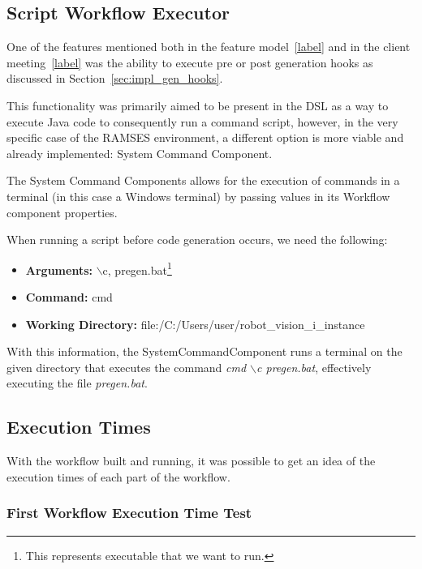 \subsection{Script Workflow Executor}
\label{sec:workflows_script_executor}

One of the features mentioned both in the feature model~\ref{label} and in the client meeting~\ref{label} was the ability to execute pre or post generation hooks as discussed in Section~\ref{sec:impl_gen_hooks}. 

This functionality was primarily aimed to be present in the \gls{DSL} as a way to execute Java code to consequently run a command script, however, in the very specific case of the \gls{RAMSES} environment, a different option is more viable and already implemented: System Command Component.

The System Command Components allows for the execution of commands in a terminal (in this case a Windows terminal) by passing values in its Workflow component properties.

When running a script before code generation occurs, we need the following:

\begin{itemize} 
	\item \textbf{Arguments: } $\backslash$c, pregen.bat\footnote{This represents executable that we want to run.}
	\item \textbf{Command: } cmd
	\item \textbf{Working Directory: } file:/C:/Users/user/robot\_vision\_i\_instance
\end{itemize}

With this information, the SystemCommandComponent runs a terminal on the given directory that executes the command \textit{cmd $\backslash$c pregen.bat}, effectively executing the file \textit{pregen.bat}.


\subsection{Execution Times}
\label{sec:exec_times}

With the workflow built and running, it was possible to get an idea of the execution times of each part of the workflow.

\subsubsection{First Workflow Execution Time Test}
\label{sec:exec_times_v1}

